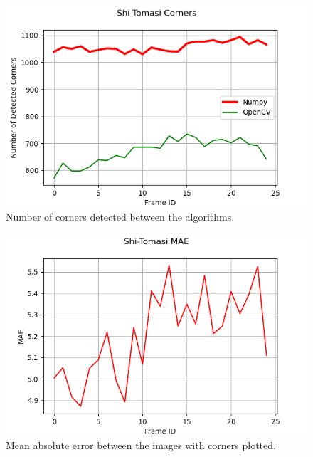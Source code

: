 \documentclass[11pt, conference, letterpaper]{IEEEtran}
\begin{document}
\begin{figure}[t]
    \centering
    \includegraphics[width=\linewidth]{images/stc_corners.png}
    \caption{Number of corners detected between the algorithms.}
    \label{fig:stc-corners}
\end{figure}

\begin{figure}[t]
    \centering
    \includegraphics[width=\linewidth]{images/stc_mae.png}
    \caption{Mean absolute error between the images with corners plotted.}
    \label{fig:stc-mae}
\end{figure}
\end{document}
